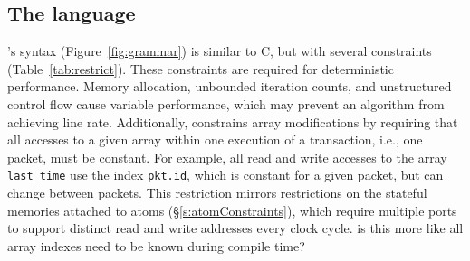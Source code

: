 

\subsection{The \pktlanguage language}
\label{ss:constraints}
\pktlanguage's syntax (Figure~\ref{fig:grammar}) is similar to C, but with
several constraints (Table~\ref{tab:restrict}).  These constraints are required
for deterministic performance.  Memory allocation, unbounded iteration counts,
and unstructured control flow cause variable performance, which may prevent an
algorithm from achieving line rate.  Additionally, \pktlanguage constrains
array modifications by requiring that all accesses to a given array within one
execution of a transaction, i.e., one packet, must be constant. 
For example, all read and write accesses to the array \texttt{last\_time} use
the index \texttt{pkt.id}, which is constant for a given packet, but can change
between packets. This restriction mirrors restrictions on the stateful memories
attached to atoms (\S\ref{s:atomConstraints}), which require multiple ports to
support distinct read and write addresses every clock cycle.
\ac{is this more like all array indexes need to be known during compile time?} 

